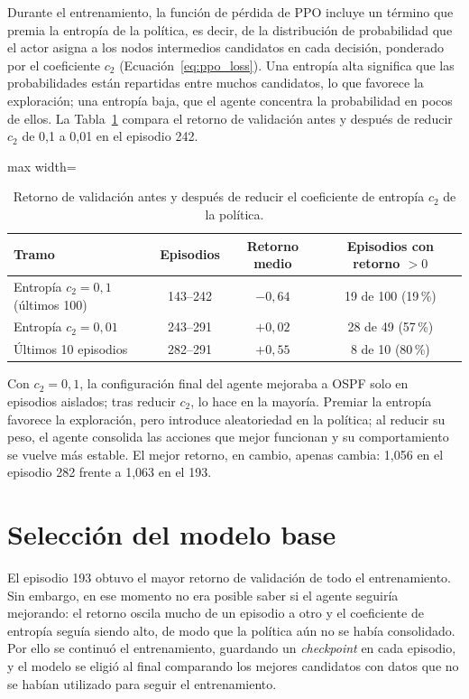 Durante el entrenamiento, la función de pérdida de PPO incluye un término que premia la entropía de la política, es decir, de la distribución de probabilidad que el actor asigna a los nodos intermedios candidatos en cada decisión, ponderado por el coeficiente $c_2$ (Ecuación~\eqref{eq:ppo_loss}). Una entropía alta significa que las probabilidades están repartidas entre muchos candidatos, lo que favorece la exploración; una entropía baja, que el agente concentra la probabilidad en pocos de ellos. La Tabla~\ref{tab:res_entropia} compara el retorno de validación antes y después de reducir $c_2$ de 0,1 a 0,01 en el episodio 242.
\begin{table}[H]
	\centering
	\footnotesize
	\begin{adjustbox}{max width=\textwidth}
	\begin{tabular}{lccc}
		\toprule
		\textbf{Tramo} & \textbf{Episodios} & \textbf{Retorno medio} & \textbf{Episodios con retorno $> 0$} \\
		\midrule
		Entropía $c_2 = 0{,}1$ (últimos 100) & 143--242 & $-0{,}64$ & 19 de 100 (19\,\%) \\
		Entropía $c_2 = 0{,}01$ & 243--291 & $+0{,}02$ & 28 de 49 (57\,\%) \\
		Últimos 10 episodios & 282--291 & $+0{,}55$ & 8 de 10 (80\,\%) \\
		\bottomrule
	\end{tabular}
	\end{adjustbox}
	\caption{Retorno de validación antes y después de reducir el coeficiente de entropía $c_2$ de la política.}
	\label{tab:res_entropia}
\end{table}

Con $c_2 = 0{,}1$, la configuración final del agente mejoraba a OSPF solo en episodios aislados; tras reducir $c_2$, lo hace en la mayoría. Premiar la entropía favorece la exploración, pero introduce aleatoriedad en la política; al reducir su peso, el agente consolida las acciones que mejor funcionan y su comportamiento se vuelve más estable. El mejor retorno, en cambio, apenas cambia: 1,056 en el episodio 282 frente a 1,063 en el 193.

\section{Selección del modelo base}\label{sec:res_seleccion}

El episodio 193 obtuvo el mayor retorno de validación de todo el entrenamiento. Sin embargo, en ese momento no era posible saber si el agente seguiría mejorando: el retorno oscila mucho de un episodio a otro y el coeficiente de entropía seguía siendo alto, de modo que la política aún no se había consolidado. Por ello se continuó el entrenamiento, guardando un \textit{checkpoint} en cada episodio, y el modelo se eligió al final comparando los mejores candidatos con datos que no se habían utilizado para seguir el entrenamiento.

